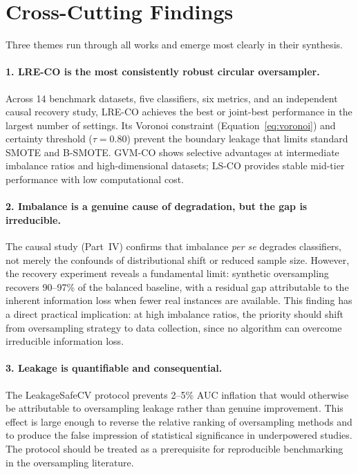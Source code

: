 \section{Cross-Cutting Findings}
\label{sec:conc:crosscutting}

Three themes run through all works and emerge most clearly in their synthesis.

\paragraph{1. LRE-CO is the most consistently robust circular oversampler.}
Across 14 benchmark datasets, five classifiers, six metrics, and an independent causal recovery study, LRE-CO achieves the best or joint-best performance in the largest number of settings.
Its Voronoi constraint (Equation~\eqref{eq:voronoi}) and certainty threshold ($\tau = 0.80$) prevent the boundary leakage that limits standard SMOTE and B-SMOTE.
GVM-CO shows selective advantages at intermediate imbalance ratios and high-dimensional datasets; LS-CO provides stable mid-tier performance with low computational cost.

\paragraph{2. Imbalance is a genuine cause of degradation, but the gap is irreducible.}
The causal study (Part~IV) confirms that imbalance \emph{per se} degrades classifiers, not merely the confounds of distributional shift or reduced sample size.
However, the recovery experiment reveals a fundamental limit: synthetic oversampling recovers 90--97\% of the balanced baseline, with a residual gap attributable to the inherent information loss when fewer real instances are available.
This finding has a direct practical implication: at high imbalance ratios, the priority should shift from oversampling strategy to data collection, since no algorithm can overcome irreducible information loss.

\paragraph{3. Leakage is quantifiable and consequential.}
The LeakageSafeCV protocol prevents 2--5\% AUC inflation that would otherwise be attributable to oversampling leakage rather than genuine improvement.
This effect is large enough to reverse the relative ranking of oversampling methods and to produce the false impression of statistical significance in underpowered studies.
The protocol should be treated as a prerequisite for reproducible benchmarking in the oversampling literature.


